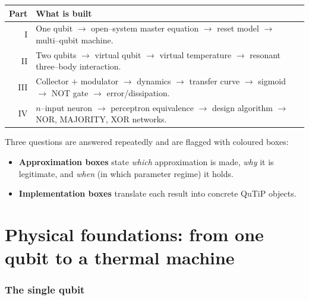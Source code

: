 \documentclass[11pt,a4paper]{article}
\theoremstyle{definition}
\theoremstyle{remark}
\begin{document}
\begin{center}
\begin{tabular}{@{}rl@{}}
\toprule
Part & What is built \\
\midrule
I   & One qubit $\to$ open--system master equation $\to$ reset model
      $\to$ multi--qubit machine. \\
II  & Two qubits $\to$ virtual qubit $\to$ virtual temperature $\to$
      resonant three--body interaction. \\
III & Collector $+$ modulator $\to$ dynamics $\to$ transfer curve
      $\to$ sigmoid $\to$ NOT gate $\to$ error/dissipation. \\
IV  & $n$--input neuron $\to$ perceptron equivalence $\to$ design
      algorithm $\to$ NOR, MAJORITY, XOR networks. \\
\bottomrule
\end{tabular}
\end{center}

\noindent
Three questions are answered repeatedly and are flagged with coloured
boxes:
\begin{itemize}[leftmargin=*]
\item \textbf{\textcolor{orange!70!black}{Approximation boxes}} state
\emph{which} approximation is made, \emph{why} it is legitimate, and
\emph{when} (in which parameter regime) it holds.
\item \textbf{\textcolor{blue!60!black}{Implementation boxes}} translate
each result into concrete QuTiP objects.
\end{itemize}

\part{Physical foundations: from one qubit to a thermal machine}
\label{part:foundations}

\section{The single qubit}
\label{sec:single-qubit}
\end{document}
